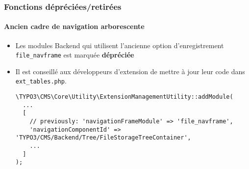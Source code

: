 %

\begin{frame}[fragile]
	\frametitle{Fonctions dépréciées/retirées}
	\framesubtitle{Ancien cadre de navigation arborescente}


	\begin{itemize}
		\item Les modules Backend qui utilisent l'ancienne option d'enregistrement
		    \texttt{file\_navframe} est marquée \textbf{dépréciée}
		\item Il est conseillé aux développeurs d'extension de mettre à jour leur code dans
			\texttt{ext\_tables.php}.
\begin{lstlisting}
\TYPO3\CMS\Core\Utility\ExtensionManagementUtility::addModule(
  ...
  [
    // previously: 'navigationFrameModule' => 'file_navframe',
    'navigationComponentId' => 'TYPO3/CMS/Backend/Tree/FileStorageTreeContainer',
    ...
  ]
);
\end{lstlisting}
	\end{itemize}

\end{frame}

